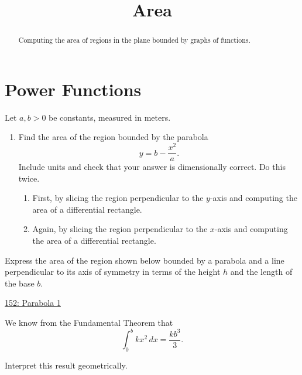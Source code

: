 \documentclass{ximera}
\title{Area}
\begin{document}
\begin{abstract}
Computing the area of regions in the plane bounded by graphs of functions.
\end{abstract}
\maketitle

\section{Power Functions}

\begin{question} \label{QWeerFGHG}
Let $a,b>0$ be constants, measured in meters. 

\begin{enumerate}

\item Find the area of the region bounded by the parabola
\[
     y  = b - \frac{x^2}{a} .
\]
Include units and check that your answer is dimensionally correct. Do this twice.

\begin{enumerate}
\item First, by slicing the region perpendicular to the $y$-axis and computing the area of a differential rectangle.

\item Again, by slicing the region perpendicular to the $x$-axis and computing the area of a differential rectangle.
\end{enumerate}
\end{enumerate}
\end{question}

\begin{question} \label{QOLDFKRerbttp}
Express the area of the region shown below bounded by a parabola and a line perpendicular to its axis of symmetry in terms of the height $h$ and the length of the base $b$.

\begin{onlineOnly}
    \begin{center}
\end{center}
\end{onlineOnly}

\href{https://www.desmos.com/calculator/kkdfpr66rt}{152: Parabola 1}

\end{question}


We know from the Fundamental Theorem that
\[
   \int_0^b kx^2\, dx = \frac{kb^3}{3}. 
\]

\begin{question} \label{QOidfsfer}
Interpret this result geometrically.
\end{question}
\end{document}
